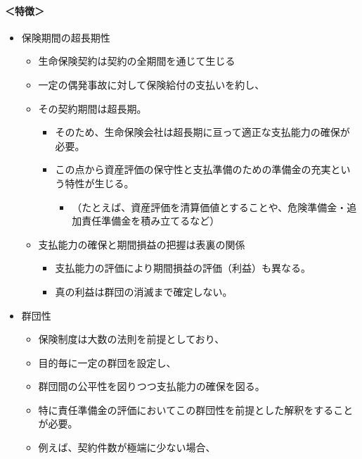 \documentclass[report,gutter=10mm,fore-edge=10mm,uplatex,dvipdfmx]{jlreq}
\begin{document}
\paragraph{＜特徴＞}

\begin{itemize}
\tightlist
\item
  保険期間の超長期性

  \begin{itemize}
  \tightlist
  \item
    生命保険契約は契約の全期間を通じて生じる
  \item
    一定の偶発事故に対して保険給付の支払いを約し、
  \item
    その契約期間は超長期。

    \begin{itemize}
    \tightlist
    \item
      そのため、生命保険会社は超長期に亘って適正な支払能力の確保が必要。
    \item
      この点から資産評価の保守性と支払準備のための準備金の充実という特性が生じる。

      \begin{itemize}
      \tightlist
      \item
        （たとえば、資産評価を清算価値とすることや、危険準備金・追加責任準備金を積み立てるなど）
      \end{itemize}
    \end{itemize}
  \item
    支払能力の確保と期間損益の把握は表裏の関係

    \begin{itemize}
    \tightlist
    \item
      支払能力の評価により期間損益の評価（利益）も異なる。
    \item
      真の利益は群団の消滅まで確定しない。
    \end{itemize}
  \end{itemize}
\item
  群団性

  \begin{itemize}
  \tightlist
  \item
    保険制度は大数の法則を前提としており、
  \item
    目的毎に一定の群団を設定し、
  \item
    群団間の公平性を図りつつ支払能力の確保を図る。
  \item
    特に責任準備金の評価においてこの群団性を前提とした解釈をすることが必要。
  \item
    例えば、契約件数が極端に少ない場合、


\end{itemize}
\end{itemize}
\end{document}

